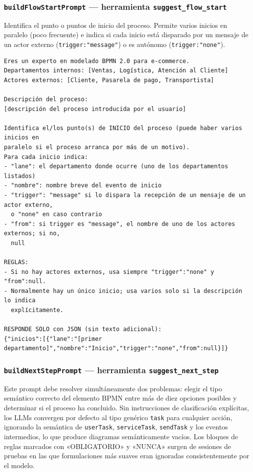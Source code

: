 \subsubsection{\texttt{buildFlowStartPrompt} — herramienta \texttt{suggest\_flow\_start}}

Identifica el punto o puntos de inicio del proceso. Permite varios inicios en paralelo (poco frecuente) e indica si cada inicio está disparado por un mensaje de un actor externo (\texttt{trigger:"message"}) o es autónomo (\texttt{trigger:"none"}).

\begin{lstlisting}[style=promptbox]
Eres un experto en modelado BPMN 2.0 para e-commerce.
Departamentos internos: [Ventas, Logística, Atención al Cliente]
Actores externos: [Cliente, Pasarela de pago, Transportista]

Descripción del proceso:
[descripción del proceso introducida por el usuario]

Identifica el/los punto(s) de INICIO del proceso (puede haber varios inicios en
paralelo si el proceso arranca por más de un motivo).
Para cada inicio indica:
- "lane": el departamento donde ocurre (uno de los departamentos listados)
- "nombre": nombre breve del evento de inicio
- "trigger": "message" si lo dispara la recepción de un mensaje de un actor externo,
  o "none" en caso contrario
- "from": si trigger es "message", el nombre de uno de los actores externos; si no,
  null

REGLAS:
- Si no hay actores externos, usa siempre "trigger":"none" y "from":null.
- Normalmente hay un único inicio; usa varios solo si la descripción lo indica
  explícitamente.

RESPONDE SOLO con JSON (sin texto adicional):
{"inicios":[{"lane":"[primer departamento]","nombre":"Inicio","trigger":"none","from":null}]}
\end{lstlisting}

\subsubsection{\texttt{buildNextStepPrompt} — herramienta \texttt{suggest\_next\_step}}

Este prompt debe resolver simultáneamente dos problemas: elegir el tipo semántico correcto del elemento BPMN entre más de diez opciones posibles y determinar si el proceso ha concluido. Sin instrucciones de clasificación explícitas, los LLMs convergen por defecto al tipo genérico \texttt{task} para cualquier acción, ignorando la semántica de \texttt{userTask}, \texttt{serviceTask}, \texttt{sendTask} y los eventos intermedios, lo que produce diagramas semánticamente vacíos. Los bloques de reglas marcados con «OBLIGATORIO» y «NUNCA» surgen de sesiones de pruebas en las que formulaciones más suaves eran ignoradas consistentemente por el modelo. 

